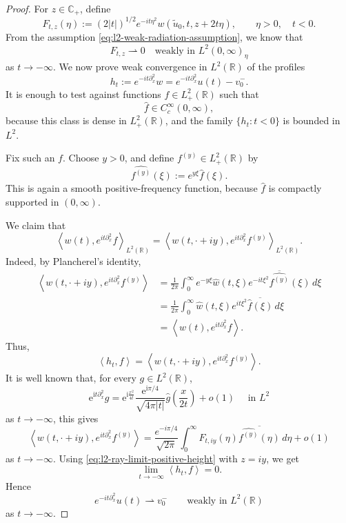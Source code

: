 \documentclass[10pt]{article}
\numberwithin{equation}{section}
\numberwithin{theorem}{section}
\begin{document}
\begin{proof}
For \(z\in\mathbb C_+\), define
\[
F_{t,z}(\eta)
:=
(2|t|)^{1/2}e^{-it\eta^2}w(\widetilde{u}_0, t,z+2t\eta),
\qquad \eta>0,\quad t<0.
\]
From the assumption \eqref{eq:l2-weak-radiation-assumption}, we know that
\begin{equation}
\label{eq:l2-ray-limit-positive-height}
F_{t,z} \rightharpoonup0
\quad\text{weakly in }L^2(0,\infty)_\eta
\end{equation}
as \(t\to-\infty\).
We now prove weak convergence in \(L^2(\mathbb R)\) of the profiles
\[
h_t:=e^{-it\partial_x^2} w = e^{-it\partial_x^2}u(t) - v_0^{-}.
\]
It is enough to test against functions \(f\in L_+^2(\mathbb R)\) such that
\[
\widehat f\in C_c^\infty(0,\infty),
\]
because this class is dense in \(L_+^2(\mathbb R)\), and the family
\(\{h_t:t<0\}\) is bounded in \(L^2\).

Fix such an \(f\). Choose \(y>0\), and define \(f^{(y)}\in L_+^2(\mathbb R)\)
by
\[
\widehat{f^{(y)}}(\xi)
:=
e^{y\xi}\widehat f(\xi).
\]
This is again a smooth positive-frequency function, because \(\widehat f\) is compactly
supported in \((0,\infty)\).

We claim that
\begin{equation}
\label{eq:horizontal-line-identity}
\left\langle
w(t),e^{it\partial_x^2}f
\right\rangle_{L^2(\mathbb R)}
=
\left\langle
w(t,\cdot+iy),e^{it\partial_x^2}f^{(y)}
\right\rangle_{L^2(\mathbb R)} .
\end{equation}
Indeed, by Plancherel's identity,
\[
\begin{aligned}
\left\langle
w(t,\cdot+iy),e^{it\partial_x^2}f^{(y)}
\right\rangle
&=
\frac1{2\pi}
\int_0^\infty
e^{-y\xi}\widehat w(t,\xi)
\overline{e^{-it\xi^2}\widehat{f^{(y)}}(\xi)}
\,d\xi \\
&=
\frac1{2\pi}
\int_0^\infty
\widehat w(t,\xi)
e^{it\xi^2}
\overline{\widehat f(\xi)}
\,d\xi  \\
&=
\left\langle
w(t),e^{it\partial_x^2}f
\right\rangle .
\end{aligned}
\]
Thus,
\[
\left\langle h_t,f\right\rangle
=
\left\langle
w(t,\cdot+iy),e^{it\partial_x^2}f^{(y)}
\right\rangle .
\]
It is well known that, for every $g \in L^2(\mathbb{R})$,
\[
\mathrm{e}^{\mathrm{i} t \partial_x^2} g=\mathrm{e}^{\mathrm{i} \frac{x^2}{4 t}} \frac{\mathrm{e}^{\mathrm{i} \pi / 4}}{\sqrt{4 \pi |t|}} \widehat{g}\left(\frac{x}{2 t}\right)+o(1) \quad \text{ in } L^2
\]
as $t \to -\infty$, this gives
\[
\left\langle
w(t,\cdot+iy),e^{it\partial_x^2}f^{(y)}
\right\rangle
=
\frac{e^{-i\pi/4}}{\sqrt{2\pi}}
\int_0^\infty
F_{t,iy}(\eta)
\overline{\widehat{f^{(y)}}(\eta)}
\,d\eta
+
o(1)
\]
as \(t\to-\infty\). Using
\eqref{eq:l2-ray-limit-positive-height} with \(z=iy\), we get
\[
\lim_{t\to-\infty}
\left\langle h_t,f\right\rangle =0.
\]
Hence
\[
e^{-it\partial_x^2}u(t)
\rightharpoonup
v_0^-
\qquad\text{weakly in }L^2(\mathbb R)
\]
as \(t\to-\infty\).


\end{proof}
\end{document}
